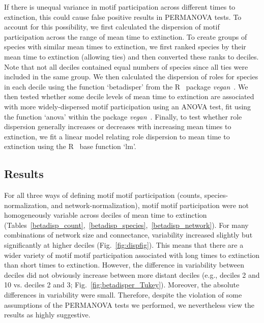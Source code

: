 \documentclass[12pt]{article}
\begin{document}
\begin{spacing}{2.0}
        If there is unequal variance in motif participation across different times to extinction, this could cause false positive results in PERMANOVA tests.
        To account for this possibility, we first calculated the dispersion of motif participation across the range of mean time to extinction.
        To create groups of species with similar mean times to extinction, we first ranked species by their mean time to extinction (allowing ties) and then converted these ranks to deciles. 
        Note that not all deciles contained equal numbers of species since all ties were included in the same group.
        We then calculated the dispersion of roles for species in each decile using the function `betadisper' from the R~\citep{R} package \emph{vegan}~\citep{vegan}.
        We then tested whether some decile levels of mean time to extinction are associated with more widely-dispersed motif participation using an ANOVA test, fit using the function `anova' within the package \emph{vegan}~\citep{vegan}.
        Finally, to test whether role dispersion generally increases or decreases with increasing mean times to extinction, we fit a linear model relating role dispersion to mean time to extinction using the R~\citep{R} base function `lm'.


	\subsection*{Results}

        For all three ways of defining motif motif participation (counts, species-normalization, and network-normalization), motif motif participation were not homogeneously variable across deciles of mean time to extinction (Tables~\ref{betadisp_count},~\ref{betadisp_species},~\ref{betadisp_network}). 
        For many combinations of network size and connectance, variability increased slightly but significantly at higher deciles (Fig.~\ref{fig:dispfig}).
        This means that there are a wider variety of motif motif participation associated with long times to extinction than short times to extinction.
        However, the difference in variability between deciles did not obviously increase between more distant deciles (e.g., deciles 2 and 10 vs. deciles 2 and 3; Fig.~\ref{fig:betadisper_Tukey}).
        Moreover, the absolute differences in variability were small.
        Therefore, despite the violation of some assumptions of the PERMANOVA tests we performed, we nevertheless view the results as highly suggestive.


\end{spacing}
\end{document}
